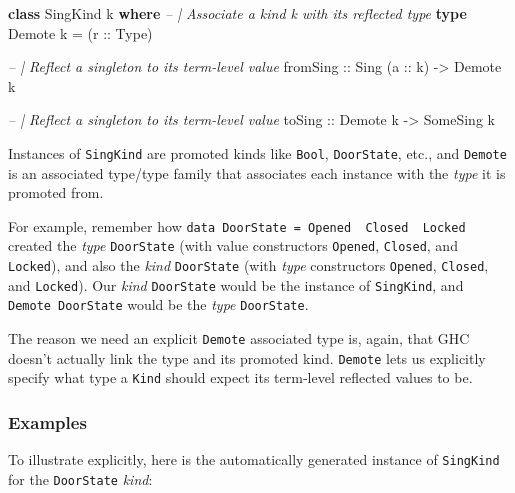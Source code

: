 \documentclass[]{article}
\newenvironment{Shaded}{}{}
\newcommand{\KeywordTok}[1]{\textcolor[rgb]{0.00,0.44,0.13}{\textbf{#1}}}
\newcommand{\DataTypeTok}[1]{\textcolor[rgb]{0.56,0.13,0.00}{#1}}
\newcommand{\CommentTok}[1]{\textcolor[rgb]{0.38,0.63,0.69}{\textit{#1}}}
\newcommand{\OtherTok}[1]{\textcolor[rgb]{0.00,0.44,0.13}{#1}}
\newcommand{\FunctionTok}[1]{\textcolor[rgb]{0.02,0.16,0.49}{#1}}
\newcommand{\NormalTok}[1]{#1}
\begin{document}
\begin{Shaded}
\begin{Highlighting}[]
\KeywordTok{class} \DataTypeTok{SingKind}\NormalTok{ k }\KeywordTok{where}
    \CommentTok{-- | Associate a kind k with its reflected type}
    \KeywordTok{type} \DataTypeTok{Demote}\NormalTok{ k }\FunctionTok{=}\NormalTok{ (}\OtherTok{r ::} \DataTypeTok{Type}\NormalTok{)}

    \CommentTok{-- | Reflect a singleton to its term-level value}
\OtherTok{    fromSing ::} \DataTypeTok{Sing}\NormalTok{ (}\OtherTok{a ::}\NormalTok{ k) }\OtherTok{->} \DataTypeTok{Demote}\NormalTok{ k}

    \CommentTok{-- | Reflect a singleton to its term-level value}
\OtherTok{    toSing ::} \DataTypeTok{Demote}\NormalTok{ k }\OtherTok{->} \DataTypeTok{SomeSing}\NormalTok{ k}
\end{Highlighting}
\end{Shaded}

Instances of \texttt{SingKind} are promoted kinds like \texttt{Bool},
\texttt{DoorState}, etc., and \texttt{Demote} is an associated type/type family
that associates each instance with the \emph{type} it is promoted from.

For example, remember how
\texttt{data\ DoorState\ =\ Opened\ \textbar{}\ Closed\ \textbar{}\ Locked}
created the \emph{type} \texttt{DoorState} (with value constructors
\texttt{Opened}, \texttt{Closed}, and \texttt{Locked}), and also the \emph{kind}
\texttt{DoorState} (with \emph{type} constructors
\texttt{\textquotesingle{}Opened}, \texttt{\textquotesingle{}Closed}, and
\texttt{\textquotesingle{}Locked}). Our \emph{kind} \texttt{DoorState} would be
the instance of \texttt{SingKind}, and \texttt{Demote\ DoorState} would be the
\emph{type} \texttt{DoorState}.

The reason we need an explicit \texttt{Demote} associated type is, again, that
GHC doesn't actually link the type and its promoted kind. \texttt{Demote} lets
us explicitly specify what type a \texttt{Kind} should expect its term-level
reflected values to be.

\subsubsection{Examples}\label{examples}

To illustrate explicitly, here is the automatically generated instance of
\texttt{SingKind} for the \texttt{DoorState} \emph{kind}:
\end{document}
